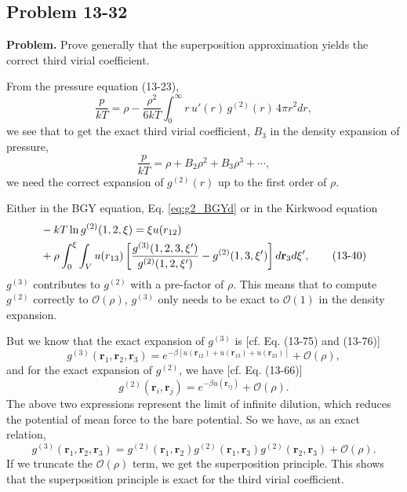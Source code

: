 \documentclass[twocolumn, 10pt]{article}
\numberwithin{equation}{section}
\newenvironment{problem}
{\par\medskip \color{problemblue}
  \textbf{Problem. }\ignorespaces}
{\medskip}
\newenvironment{solution}[1][\empty]
{\par\medskip\sffamily
  \textbf{\ifx\empty#1{Solution.}\relax\else{#1}\fi} \ignorespaces}
{\medskip}
\begin{document}
\subsection{Problem 13-32}

\begin{problem}
  Prove generally that the superposition approximation
  yields the correct third virial coefficient.
\end{problem}

\begin{solution}
  From the pressure equation (13-23),
  \begin{equation}
    \frac{p}{kT}
    =
    \rho - \frac{\rho^2}{6kT}
    \int_0^\infty r \, u'(r) \, g^{(2)}(r) \, 4 \pi r^2 dr
    ,
    \tag{13-23}
  \end{equation}
  we see that to get the exact third virial coefficient, $B_3$
  in the density expansion of pressure,
  $$
  \frac{p}{kT} = \rho + B_2 \rho^2 + B_3 \rho^3 + \cdots,
  $$
  we need the correct expansion of $g^{(2)}(r)$
  up to the first order of $\rho$.

  Either in the BGY equation, Eq. \eqref{eq:g2_BGYd}
  or in the Kirkwood equation
  \begin{align}
    &-kT \ln g^{(2)}(1, 2, \xi)
    =
    \xi u(r_{12})
    \notag \\
    &+
    \rho\int_0^\xi
    \int_V u(r_{13})
    \left[
      \frac{g^{(3)}(1, 2, 3, \xi')}{g^{(2)}(1,2,\xi')}
      -
      g^{(2)}(1, 3, \xi')
      \right] d\mathbf r_3 d\xi'
    ,
    \tag{13-40}
  \end{align}
  $g^{(3)}$ contributes to $g^{(2)}$
  with a pre-factor of $\rho$.
  This means that to compute $g^{(2)}$ correctly
  to $\mathcal O(\rho)$,
  $g^{(3)}$ only needs to be exact
  to $\mathcal O(1)$ in the density expansion.

  But we know that the exact expansion of $g^{(3)}$ is
  [cf. Eq. (13-75) and (13-76)]
  $$
  g^{(3)}(\mathbf r_1, \mathbf r_2, \mathbf r_3)
  =
  e^{-\beta [u(\mathbf r_{12}) + u(\mathbf r_{13}) + u(\mathbf r_{23})]}
  + \mathcal O(\rho)
  ,
  $$
  and for the exact expansion of $g^{(2)}$, we have
  [cf. Eq. (13-66)]
  $$
  g^{(2)}(\mathbf r_i, \mathbf r_j)
  =
  e^{-\beta u(\mathbf r_{ij})}
  + \mathcal O(\rho)
  .
  $$
  The above two expressions represent the limit of
  infinite dilution,
  which reduces
  the potential of mean force to
  the bare potential.
  So we have, as an exact relation,
  $$
  g^{(3)}(\mathbf r_1, \mathbf r_2, \mathbf r_3)
  =
  g^{(2)}(\mathbf r_1, \mathbf r_2)
  g^{(2)}(\mathbf r_1, \mathbf r_3)
  g^{(2)}(\mathbf r_2, \mathbf r_3)
  + \mathcal O(\rho).
  $$
  If we truncate the $\mathcal O(\rho)$ term,
  we get the superposition principle.
  This shows that the superposition principle
  is exact for the third virial coefficient.
\end{solution}
\end{document}

